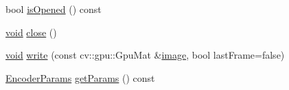 \begin{DoxyCompactItemize}
\item 
bool \hyperlink{classcv_1_1gpu_1_1VideoWriter__GPU_a0acbab4bb28a3eedf5e51895d12e3724}{is\-Opened} () const 
\item 
\hyperlink{legacy_8hpp_a8bb47f092d473522721002c86c13b94e}{void} \hyperlink{classcv_1_1gpu_1_1VideoWriter__GPU_a53434b018cd5dfc36cd855f89625fdc5}{close} ()
\item 
\hyperlink{legacy_8hpp_a8bb47f092d473522721002c86c13b94e}{void} \hyperlink{classcv_1_1gpu_1_1VideoWriter__GPU_aaabe0dc564532c735f20b2f18b8b6511}{write} (const cv\-::gpu\-::\-Gpu\-Mat \&\hyperlink{legacy_8hpp_ad62b16ab219ae2483e8a3d921c44cc97}{image}, bool last\-Frame=false)
\item 
\hyperlink{structcv_1_1gpu_1_1VideoWriter__GPU_1_1EncoderParams}{Encoder\-Params} \hyperlink{classcv_1_1gpu_1_1VideoWriter__GPU_a009c469019a65394bb08663631c80cc7}{get\-Params} () const 
\end{DoxyCompactItemize}


